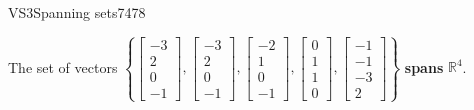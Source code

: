 \begin{exercise}{VS3}{Spanning sets}{7478}
\begin{exerciseAnswer}
 

 The set of vectors \(\left\{ \left[\begin{array}{c}
-3 \\
2 \\
0 \\
-1
\end{array}\right] , \left[\begin{array}{c}
-3 \\
2 \\
0 \\
-1
\end{array}\right] , \left[\begin{array}{c}
-2 \\
1 \\
0 \\
-1
\end{array}\right] , \left[\begin{array}{c}
0 \\
1 \\
1 \\
0
\end{array}\right] , \left[\begin{array}{c}
-1 \\
-1 \\
-3 \\
2
\end{array}\right] \right\}\) \textbf{spans} \(\mathbb{R}^4\). 

 \end{exerciseAnswer}
 \end{exercise}


